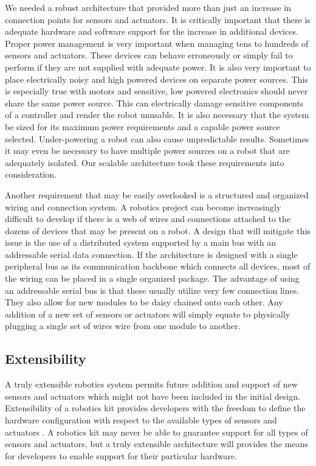  We needed a robust architecture that provided more than just an increase in connection points for sensors and actuators. It is critically important that there is adequate hardware and software support for the increase in additional devices. Proper power management is very important when managing tens to hundreds of sensors and actuators. These devices can behave erroneously or simply fail to perform if they are not supplied with adequate power. It is also very important to place electrically noisy and high powered devices on separate power sources. This is especially true with motors and sensitive, low powered electronics should never share the same power source. This can electrically damage sensitive components of a controller and render the robot unusable. It is also necessary that the system be sized for its maximum power requirements and a capable power source selected. Under-powering a robot can also cause unpredictable results. Sometimes it may even be necessary to have multiple power sources on a robot that are adequately isolated. Our scalable architecture took these requirements into consideration.

Another requirement that may be easily overlooked is a structured and organized wiring and connection system. A robotics project can become increasingly difficult to develop if there is a web of wires and connections attached to the dozens of devices that may be present on a robot. A design that will mitigate this issue is the use of a distributed system supported by a main bus with an addressable serial data connection. If the architecture is designed with a single peripheral bus as its communication backbone which connects all devices, most of the wiring can be placed in a single organized package. The advantage of using an addressable serial bus is that these usually utilize very few connection lines. They also allow for new modules to be daisy chained onto each other. Any addition of a new set of sensors or actuators will simply equate to physically plugging a single set of wires wire from one module to another.




\subsection{Extensibility} %
\label{sub:extensibility}
A truly extensible robotics system permits future addition and support of new sensors and actuators which might not have been included in the initial design. Extensibility of a robotics kit provides developers with the freedom to define the hardware configuration with respect to the available types of sensors and actuators \cite{rdk}. A robotics kit may never be able to guarantee support for all types of sensors and actuators, but a truly extensible architecture will provides the means for developers to enable support for their particular hardware. 

